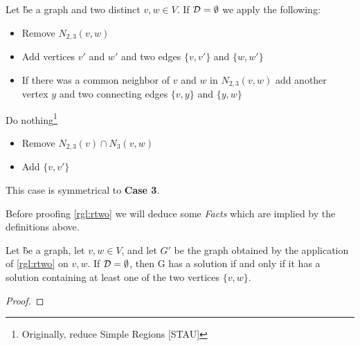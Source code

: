 \begin{rgl}\label{rgl:rtwo}
    Let \G be a graph and two distinct $v,w \in V$. If $\mathcal{D} = \emptyset$ we apply the following:
    \begin{caseof}

        \vspace{-5mm}
        \begin{itemize}
            \item Remove $N_{2,3}(v,w)$
            \item Add vertices $v'$ and $w'$ and two edges $\{v, v'\}$ and $\{w, w'\}$
            \item If there was a common neighbor of $v$ and $w$ in $N_{2,3}(v,w)$ add another vertex $y$ and two connecting edges  $\{v, y\}$ and $\{y, w\}$
        \end{itemize}
        Do nothing\footnote{Originally, reduce Simple Regions [STAU]}


        \vspace{-5mm}
        \begin{itemize}
            \item Remove $N_{2,3}(v) \cap N_3(v,w)$
            \item Add $\{v, v'\}$ 
        \end{itemize}

         This case is symmetrical to \textbf{Case 3}. 
    \end{caseof}
\end{rgl}


Before proofing \cref{rgl:rtwo} we will deduce some \textit{Facts} which are implied by the definitions above.

\begin{fact}
    Let \G be a graph, let $v,w \in V$, and let $G'$ be the graph obtained by the application of \cref{rgl:rtwo} on $v,w$. If $\mathcal{D} = \emptyset$, then G has a solution if and only if it has a solution containing at least one of the two vertices $\{v,w \}$.
\end{fact}
\begin{proof}
    
\end{proof}

